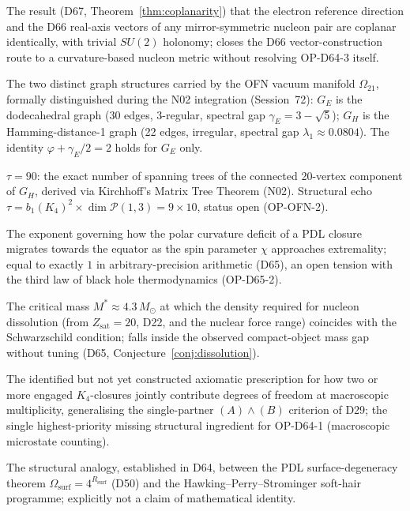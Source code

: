 \documentclass[11pt,a4paper]{article}
\theoremstyle{plain}
\theoremstyle{definition}
\theoremstyle{remark}
\newcommand{\Kfour}{K_4}
\newcommand{\Rsurf}{R_{\mathrm{surf}}}
\newcommand{\Zsat}{Z_{\mathrm{sat}}}
\begin{document}
\begin{description}[leftmargin=3.5cm, style=nextline]
\item[Coplanarity theorem] The result (D67, Theorem~\ref{thm:coplanarity}) that the electron reference direction and the D66 real-axis vectors of any mirror-symmetric nucleon pair are coplanar identically, with trivial $SU(2)$ holonomy; closes the D66 vector-construction route to a curvature-based nucleon metric without resolving OP-D64-3 itself.
\item[$G_E$, $G_H$] The two distinct graph structures carried by the OFN vacuum manifold $\Omega_{21}$, formally distinguished during the N02 integration (Session~72): $G_E$ is the dodecahedral graph (30 edges, 3-regular, spectral gap $\gamma_E=3-\sqrt5$); $G_H$ is the Hamming-distance-1 graph (22 edges, irregular, spectral gap $\lambda_1\approx0.0804$). The identity $\varphi+\gamma_E/2=2$ holds for $G_E$ only.
\item[$\tau$ (spanning-tree invariant)] $\tau=90$: the exact number of spanning trees of the connected 20-vertex component of $G_H$, derived via Kirchhoff's Matrix Tree Theorem (N02). Structural echo $\tau=b_1(K_4)^2\times\dim\mathcal P(1,3)=9\times10$, status open (OP-OFN-2).
\item[Curvature-migration exponent] The exponent governing how the polar curvature deficit of a PDL closure migrates towards the equator as the spin parameter $\chi$ approaches extremality; equal to exactly $1$ in arbitrary-precision arithmetic (D65), an open tension with the third law of black hole thermodynamics (OP-D65-2).
\item[Dissolution threshold $M^*$] The critical mass $M^*\approx4.3\,M_\odot$ at which the density required for nucleon dissolution (from $\Zsat=20$, D22, and the nuclear force range) coincides with the Schwarzschild condition; falls inside the observed compact-object mass gap without tuning (D65, Conjecture~\ref{conj:dissolution}).
\item[$K_4\leftrightarrow K_4$ coupling rule] The identified but not yet constructed axiomatic prescription for how two or more engaged $\Kfour$-closures jointly contribute degrees of freedom at macroscopic multiplicity, generalising the single-partner $(A)\wedge(B)$ criterion of D29; the single highest-priority missing structural ingredient for OP-D64-1 (macroscopic microstate counting).
\item[Soft-hair correspondence] The structural analogy, established in D64, between the PDL surface-degeneracy theorem $\Omega_{\mathrm{surf}}=4^{\Rsurf}$ (D50) and the Hawking--Perry--Strominger soft-hair programme; explicitly not a claim of mathematical identity.

\end{description}
\end{document}
